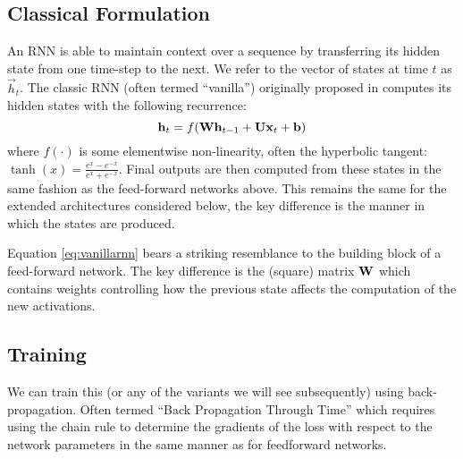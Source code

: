 \subsection{Classical Formulation}
An RNN is able to maintain context over a sequence by transferring its hidden state from one
time-step to the next. We refer to the vector of states at time \(t\) as \(\vec{h}_t\).
The classic RNN (often termed ``vanilla'') originally proposed in \autocite{Elman1990}
computes its hidden states with the following recurrence:
\begin{equation}
	\mathbf{h}_t = f(\mathbf{W}\mathbf{h}_{t-1} + \mathbf{U}\mathbf{x}_t +  \mathbf{b})
\label{eq:vanillarnn}
\end{equation} where \(f(\cdot)\) is some elementwise non-linearity, often the hyperbolic tangent:
\(\tanh(x) = \frac{e^{x} - e^{-x}}{e^{x} + e^{-x}}\). Final outputs are then computed from these
states in the same fashion as the feed-forward networks above. This remains the same for the
extended architectures considered below, the key difference is the manner in which the states
are produced.

Equation \eqref{eq:vanillarnn} bears a striking resemblance to the building block of a 
feed-forward network. The key difference is the (square) matrix \(\mathbf{W}\) which contains weights
controlling how the previous state affects the computation of the new activations.

\subsection{Training}
We can train this (or any of the variants we will see subsequently) using back-propagation.
Often termed ``Back Propagation Through Time'' \autocite{Werbos1990} which requires using the
chain rule to determine the gradients of the loss with respect to the network parameters in
the same manner as for feedforward networks.


